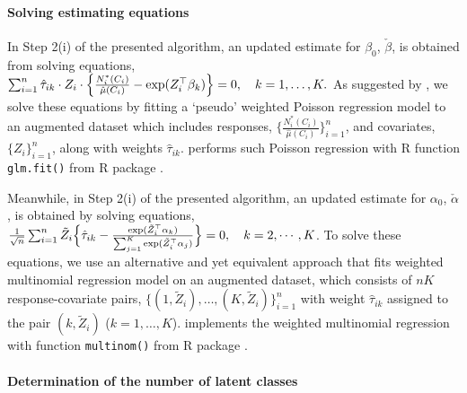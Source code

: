 \hypertarget{solving-estimating-equations}{%
\paragraph{Solving estimating equations}\label{solving-estimating-equations}}

In Step 2(i) of the presented algorithm, an updated estimate for \(\beta_0\), \(\check\beta\), is obtained from
solving equations,
\(\sum _{i = 1} ^{n} \hat{\tau} _{ik} \cdot Z_i \cdot \Bigl\{ \frac{N _{i} ^{*} (C _i )}{\hat{\mu} (C_i)} - \exp (Z_i ^{\top} \beta _k ) \Bigr\} = 0 , \quad k = 1, \dots, K.\)
As suggested by \citet{zhao2022semiparametric}, we solve these equations by fitting a
`pseudo' weighted Poisson regression model to an augmented dataset which includes responses,
\(\{\frac{N _{i} ^{*} (C _i )}{\hat{\mu} (C_i)}\}_{i=1}^n\), and covariates, \(\{Z_i\}_{i=1}^n\),
along with weights \(\hat{\tau}_{ik}\).  performs such Poisson regression with R function \texttt{glm.fit()} from R package .

Meanwhile, in Step 2(i) of the presented algorithm, an updated estimate for \(\alpha_0\), \(\check{\alpha}\), is
obtained by solving equations,
\(\frac{1}{\sqrt{n}} \sum _{i =1} ^{n} \tilde{Z}_i \Bigl\{ \hat{\tau} _{ik} - \frac{\exp(\tilde{Z} _{i} ^{\top} \alpha _{k}) }{\sum _{j = 1} ^{K} \exp(\tilde{Z} _{i} ^{\top} \alpha _{j})} \Bigr\} = 0, \quad k = 2, \cdots, K\).
To solve these equations, we use an alternative and yet equivalent approach that fits weighted multinomial regression model on an augmented dataset, which consists of \(nK\) response-covariate pairs, \(\{(1, \tilde Z_i),\ldots, (K, \tilde Z_i)\}_{i=1}^n\) with weight \(\hat\tau_{ik}\) assigned to the pair \((k, \tilde Z_i)\) (\(k=1,\ldots, K\)).  implements the weighted multinomial regression with function \texttt{multinom()} from R package  \citep{nnet}.

\hypertarget{determination-of-the-number-of-latent-classes}{%
\paragraph{Determination of the number of latent classes}\label{determination-of-the-number-of-latent-classes}}

